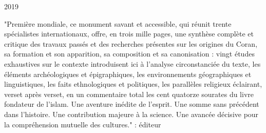 2019

 "Première mondiale, ce monument savant et accessible, qui réunit trente spécialistes internationaux, offre, en trois mille pages, une synthèse complète et critique des travaux passés et des recherches présentes sur les origines du Coran, sa formation et son apparition, sa composition et sa canonisation : vingt études exhaustives sur le contexte introduisent ici à l'analyse circonstanciée du texte, les éléments archéologiques et épigraphiques, les environnements géographiques et linguistiques, les faits ethnologiques et politiques, les parallèles religieux éclairant, verset après verset, en un commentaire total les cent quatorze sourates du livre fondateur de l'islam. Une aventure inédite de l'esprit. Une somme sans précédent dans l'histoire. Une contribution majeure à la science. Une avancée décisive pour la compréhension mutuelle des cultures." : éditeur

